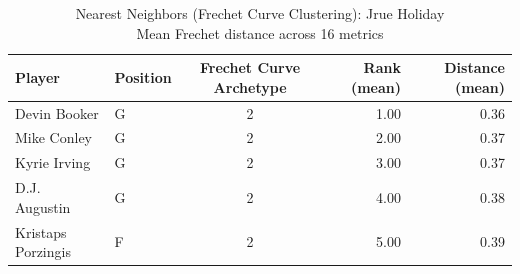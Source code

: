 \begin{table}[t]
\caption*{
{\fontsize{20}{25} Nearest Neighbors (Frechet Curve Clustering): Jrue Holiday\fontsize{12}{15}\selectfont } \\ 
{\fontsize{14}{17}\selectfont  Mean Frechet distance across 16 metrics\fontsize{12}{15}\selectfont }
} 
\fontsize{12.0pt}{14.0pt}\selectfont
\begin{tabular*}{\linewidth}{@{\extracolsep{\fill}}llcrr}
\toprule
Player & Position & Frechet Curve Archetype & Rank (mean) & Distance (mean) \\ 
\midrule\addlinespace[2.5pt]
Devin Booker & G & 2 & 1.00 & 0.36 \\ 
Mike Conley & G & 2 & 2.00 & 0.37 \\ 
Kyrie Irving & G & 2 & 3.00 & 0.37 \\ 
D.J. Augustin & G & 2 & 4.00 & 0.38 \\ 
Kristaps Porzingis & F & 2 & 5.00 & 0.39 \\ 
\bottomrule
\end{tabular*}
\end{table}

